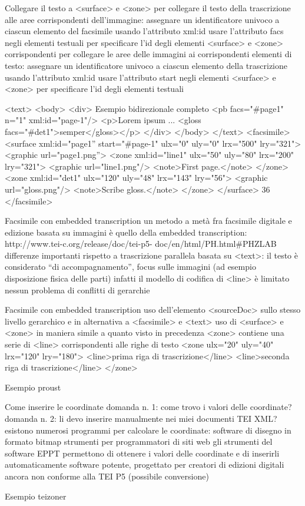 Collegare il testo a <surface> e <zone>
per collegare il testo della trascrizione alle aree corrispondenti dell’immagine:
assegnare un identificatore univoco a ciascun elemento del facsimile usando l’attributo xml:id
usare l’attributo facs negli elementi testuali per specificare l’id degli elementi <surface> e <zone> corrispondenti
per collegare le aree delle immagini ai corrispondenti elementi di testo:
assegnare un identificatore univoco a ciascun elemento della trascrizione usando l’attributo xml:id
usare l’attributo start negli elementi <surface> e <zone> per
specificare l’id degli elementi testuali

<text>
 <body>
  <div>
Esempio bidirezionale completo
<pb facs="\#page1" n="1" xml:id="page-1"/>
<p>Lorem ipsum ... <gloss facs="\#det1">semper</gloss></p> </div>
 </body>
</text>
<facsimile>
<surface xml:id="page1” start="\#page-1" ulx="0" uly="0" lrx="500" lry="321">
<graphic url="page1.png”>
<zone xml:id="line1" ulx="50" uly="80" lrx="200" lry="321">
<graphic url="line1.png"/>
<note>First page.</note> </zone>
<zone xml:id="det1" ulx="120" uly="48" lrx="143" lry="56"> <graphic url="gloss.png"/>
<note>Scribe gloss.</note>
  </zone>
 </surface>
36
</facsimile>

Facsimile con embedded transcription un metodo a metà fra facsimile digitale e edizione basata
su immagini è quello della embedded transcription: http://www.tei-c.org/release/doc/tei-p5-
doc/en/html/PH.html\#PHZLAB
differenze importanti rispetto a trascrizione parallela basata su <text>:
il testo è considerato “di accompagnamento”, focus sulle immagini (ad esempio disposizione fisica delle parti)
infatti il modello di codifica di <line> è limitato nessun problema di conflitti di gerarchie

Facsimile con embedded transcription uso dell’elemento <sourceDoc> sullo stesso livello
gerarchico e in alternativa a <facsimile> e <text>
uso di <surface> e <zone> in maniera simile a quanto visto in precedenza
<zone> contiene una serie di <line> corrispondenti alle righe di testo
<zone ulx="20" uly="40" lrx="120" lry="180">
   <line>prima riga di trascrizione</line>
   <line>seconda riga di trascrizione</line>
</zone>

Esempio proust

Come inserire le coordinate
domanda n. 1: come trovo i valori delle coordinate?
domanda n. 2: li devo inserire manualmente nei miei documenti TEI XML?
esistono numerosi programmi per calcolare le coordinate:
software di disegno in formato bitmap strumenti per programmatori di siti web
gli strumenti del software EPPT permettono di ottenere i valori delle coordinate e di inserirli automaticamente
software potente, progettato per creatori di edizioni digitali ancora non conforme alla TEI P5 (possibile conversione)

Esempio teizoner



